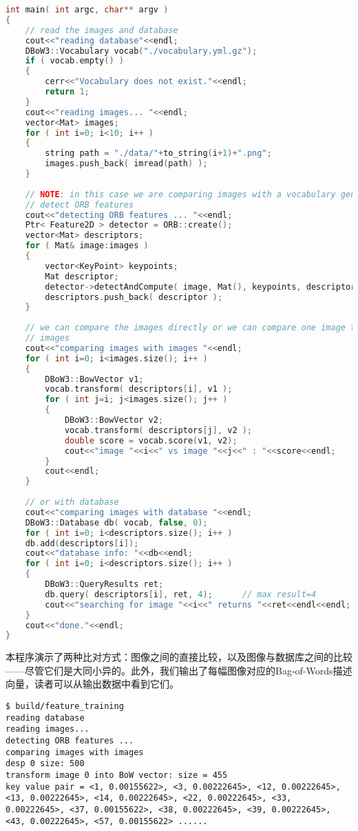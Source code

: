 \begin{lstlisting}[language=c++,caption=slambook/ch12/loop\_closure.cpp]
int main( int argc, char** argv )
{
	// read the images and database  
	cout<<"reading database"<<endl;
	DBoW3::Vocabulary vocab("./vocabulary.yml.gz");
	if ( vocab.empty() )
	{
		cerr<<"Vocabulary does not exist."<<endl;
		return 1;
	}
	cout<<"reading images... "<<endl;
	vector<Mat> images; 
	for ( int i=0; i<10; i++ )
	{
		string path = "./data/"+to_string(i+1)+".png";
		images.push_back( imread(path) );
	}
	
	// NOTE: in this case we are comparing images with a vocabulary generated by themselves, this may leed to overfitting.  
	// detect ORB features
	cout<<"detecting ORB features ... "<<endl;
	Ptr< Feature2D > detector = ORB::create();
	vector<Mat> descriptors;
	for ( Mat& image:images )
	{
		vector<KeyPoint> keypoints; 
		Mat descriptor;
		detector->detectAndCompute( image, Mat(), keypoints, descriptor );
		descriptors.push_back( descriptor );
	}
	
	// we can compare the images directly or we can compare one image to a database 
	// images 
	cout<<"comparing images with images "<<endl;
	for ( int i=0; i<images.size(); i++ )
	{
		DBoW3::BowVector v1;
		vocab.transform( descriptors[i], v1 );
		for ( int j=i; j<images.size(); j++ )
		{
			DBoW3::BowVector v2;
			vocab.transform( descriptors[j], v2 );
			double score = vocab.score(v1, v2);
			cout<<"image "<<i<<" vs image "<<j<<" : "<<score<<endl;
		}
		cout<<endl;
	}
	
	// or with database 
	cout<<"comparing images with database "<<endl;
	DBoW3::Database db( vocab, false, 0);
	for ( int i=0; i<descriptors.size(); i++ )
	db.add(descriptors[i]);
	cout<<"database info: "<<db<<endl;
	for ( int i=0; i<descriptors.size(); i++ )
	{
		DBoW3::QueryResults ret;
		db.query( descriptors[i], ret, 4);      // max result=4
		cout<<"searching for image "<<i<<" returns "<<ret<<endl<<endl;
	}
	cout<<"done."<<endl;
}
\end{lstlisting}

本程序演示了两种比对方式：图像之间的直接比较，以及图像与数据库之间的比较——尽管它们是大同小异的。此外，我们输出了每幅图像对应的Bag-of-Words描述向量，读者可以从输出数据中看到它们。

\begin{lstlisting}
$ build/feature_training
reading database
reading images... 
detecting ORB features ... 
comparing images with images 
desp 0 size: 500
transform image 0 into BoW vector: size = 455
key value pair = <1, 0.00155622>, <3, 0.00222645>, <12, 0.00222645>, <13, 0.00222645>, <14, 0.00222645>, <22, 0.00222645>, <33, 0.00222645>, <37, 0.00155622>, <38, 0.00222645>, <39, 0.00222645>, <43, 0.00222645>, <57, 0.00155622> ......
\end{lstlisting}

